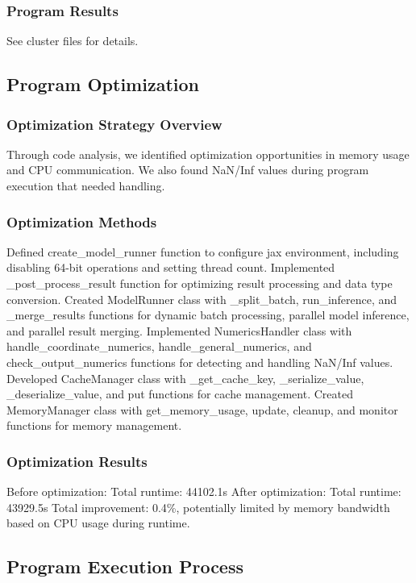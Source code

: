 \documentclass[a4paper,12pt]{article}
\begin{document}
\subsubsection{Program Results}
See cluster files for details.

\subsection{Program Optimization}

\subsubsection{Optimization Strategy Overview}
Through code analysis, we identified optimization opportunities in memory usage and CPU communication. We also found NaN/Inf values during program execution that needed handling.

\subsubsection{Optimization Methods}
Defined create\_model\_runner function to configure jax environment, including disabling 64-bit operations and setting thread count. Implemented \_post\_process\_result function for optimizing result processing and data type conversion. Created ModelRunner class with \_split\_batch, run\_inference, and \_merge\_results functions for dynamic batch processing, parallel model inference, and parallel result merging. Implemented NumericsHandler class with handle\_coordinate\_numerics, handle\_general\_numerics, and check\_output\_numerics functions for detecting and handling NaN/Inf values. Developed CacheManager class with \_get\_cache\_key, \_serialize\_value, \_deserialize\_value, and put functions for cache management. Created MemoryManager class with get\_memory\_usage, update, cleanup, and monitor functions for memory management.

\subsubsection{Optimization Results}
Before optimization: Total runtime: 44102.1s
After optimization: Total runtime: 43929.5s
Total improvement: 0.4\%, potentially limited by memory bandwidth based on CPU usage during runtime.

\subsection{Program Execution Process}
\end{document}
